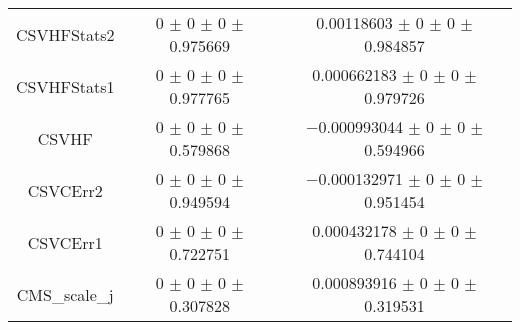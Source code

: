 \begin{table}
\begin{tabular}{ccc}
CSVHFStats2 & \num{0} $\pm$ \num{0} $\pm$ \num{0} $\pm$ \num{0.975669} & \num{0.00118603} $\pm$ \num{0} $\pm$ \num{0} $\pm$ \num{0.984857}\\
CSVHFStats1 & \num{0} $\pm$ \num{0} $\pm$ \num{0} $\pm$ \num{0.977765} & \num{0.000662183} $\pm$ \num{0} $\pm$ \num{0} $\pm$ \num{0.979726}\\
CSVHF & \num{0} $\pm$ \num{0} $\pm$ \num{0} $\pm$ \num{0.579868} & \num{-0.000993044} $\pm$ \num{0} $\pm$ \num{0} $\pm$ \num{0.594966}\\
CSVCErr2 & \num{0} $\pm$ \num{0} $\pm$ \num{0} $\pm$ \num{0.949594} & \num{-0.000132971} $\pm$ \num{0} $\pm$ \num{0} $\pm$ \num{0.951454}\\
CSVCErr1 & \num{0} $\pm$ \num{0} $\pm$ \num{0} $\pm$ \num{0.722751} & \num{0.000432178} $\pm$ \num{0} $\pm$ \num{0} $\pm$ \num{0.744104}\\
CMS\_scale\_j & \num{0} $\pm$ \num{0} $\pm$ \num{0} $\pm$ \num{0.307828} & \num{0.000893916} $\pm$ \num{0} $\pm$ \num{0} $\pm$ \num{0.319531}\\
\bottomrule
\end{tabular}
\end{table}